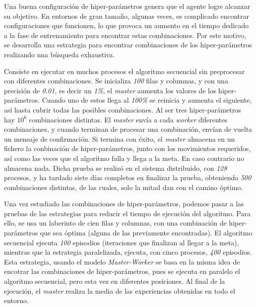 		
		
		
		Una buena configuración de hiper-parámetros genera que el agente logre alcanzar su objetivo. En entornos de gran tamaño, algunas veces, es complicado encontrar configuraciones que funcionen, lo que provoca un aumento en el tiempo dedicado a la fase de entrenamiento para encontrar estas combinaciones. Por este motivo, se desarrolla una estrategia para encontrar combinaciones de los hiper-parámetros realizando una búsqueda exhaustiva. 
		
		Consiste en ejecutar en muchos procesos el algoritmo secuencial sin preprocesar con diferentes combinaciones. Se inicializa \textit{100} filas y columnas, y con una precisión de \textit{0.01}, es decir un \textit{1\%}, el \textit{master} aumenta los valores de los hiper-parámetros. Cuando uno de estos llega al \textit{100\%} se reinicia y aumenta el siguiente, así hasta cubrir todas las posibles combinaciones. Al ser tres hiper-parámetros hay \(10^{6}\) combinaciones distintas. El \textit{master} envía a cada \textit{worker} diferentes combinaciones, y cuando terminan de procesar una combinación, envían de vuelta un mensaje de confirmación. Si termina con éxito, el \textit{master} almacena en un fichero la conbinación de hiper-parámetros, junto con los movimientos requeridos, así como las veces que el algoritmo falla y llega a la meta. En caso contrario no almacena nada. Dicha prueba se realizó en el sistema distribuido, con \textit{128} procesos, y ha tardado siete días completos en finalizar la prueba, obteniendo \textit{500} combinaciones distintas, de las cuales, solo la mitad dan con el camino óptimo.
		


		
	
	
		Una vez estudiado las combinaciones de hiper-parámetros, podemos pasar a las pruebas de las estrategias para reducir el tiempo de ejecución del algoritmo. Para ello, se usa un laberinto de cien filas y columnas, con una combinación de hiper-parámetros que sea óptima (alguna de las previamente encontradas). El algoritmo secuencial ejecuta \textit{100} episodios (iteraciones que finalizan al llegar a la meta), mientras que la estrategia paralelizada, ejecuta, con cinco procesos, \textit{400} episodios. Esta estrategia, usando el modelo \textit{Master-Worker} se basa en la misma idea de encotrar las combinaciones de hiper-parámetros, pues se ejecuta en paralelo el algoritmo secuencial, pero esta vez en diferentes posiciones. Al final de la ejecución, el \textit{master} realiza la media de las experiencias obtenidas en todo el entorno. 
		
